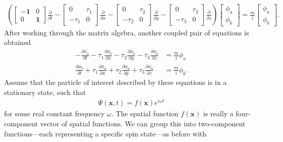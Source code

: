 \documentclass[titlepage,letterpaper,onecolumn,11pt,final]{report}
\newcommand{\psxt}{\Psi (\mathbf{x},t)}
\numberwithin{equation}{section}
\numberwithin{figure}{section}
\begin{document}
\begin{gather}
	\label{eq:dirac_equation_matrix_alt}
	\left(
	\begin{bmatrix}
		-\mathbf{1} & 0   \\
		0 & \mathbf{1}   
	\end{bmatrix}
	\frac{\partial}{\partial t} -
	\begin{bmatrix}
		0 & \tau_{1}  \\
		-\tau_{1} & 0  
	\end{bmatrix}
	\frac{\partial}{\partial x} -
	\begin{bmatrix}
		0 & \tau_{2}  \\
		-\tau_{2} & 0  
	\end{bmatrix}	
	\frac{\partial}{\partial y} -
	\begin{bmatrix}
		0 & \tau_{3}  \\
		-\tau_{3} & 0  
	\end{bmatrix}	
	\frac{\partial}{\partial z} \right)
	\begin{bmatrix}
		\phi_{a}\\
		\phi_{b}
	\end{bmatrix}
	= \frac{m}{i} 
	\begin{bmatrix}
		\phi_{a}\\
		\phi_{b}
	\end{bmatrix}	.
\end{gather}
%
After working through the matrix algebra, another coupled pair of equations is obtained
\begin{subequations}
\begin{align}
	\label{eq:dirac_equation_d1}
	- \frac{\partial \phi_{a}}{\partial t} - \tau_{1} \frac{\partial \phi_{b}}{\partial x} - \tau_{2} \frac{\partial \phi_{b}}{\partial y} - \tau_{3} \frac{\partial \phi_{b}}{\partial z} &= \frac{m}{i} \phi_{a}  \\
	\label{eq:dirac_equation_d2}
	\frac{\partial \phi_{b}}{\partial t} + \tau_{1} \frac{\partial \phi_{a}}{\partial x} + \tau_{2} \frac{\partial \phi_{a}}{\partial y} + \tau_{3} \frac{\partial \phi_{a}}{\partial z} &= \frac{m}{i} \phi_{b} .
\end{align}
\end{subequations}
%
Assume that the particle of interest described by these equations is in a stationary state, such that
\begin{gather}
	\psxt = f (\mathbf{x}) e^{i \omega t}
\end{gather}
for some real constant frequency $\omega$. The spatial function $f (\mathbf{x})$ is really a four-component vector of spatial functions. We can group this into two-component functions---each representing a specific spin state---as before with
\end{document}
